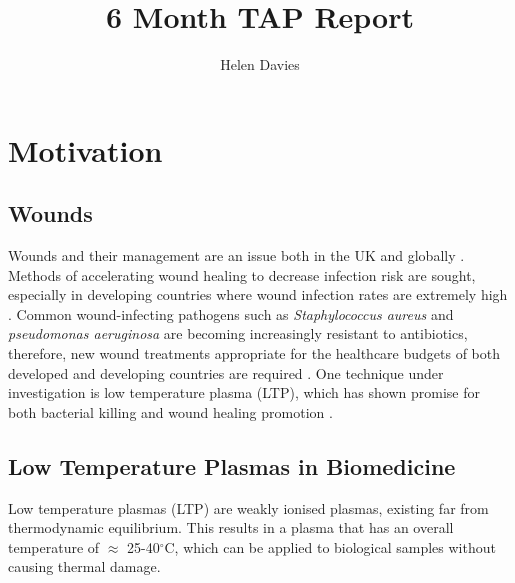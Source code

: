 \documentclass[11pt, oneside]{article}   	%
\title{6 Month TAP Report}
\author{Helen Davies}
\date{}							%
\begin{document}
\maketitle

\section{Motivation}
\subsection{Wounds}

Wounds and their management are an issue both in the UK and globally \cite{Posnett2008the}.
Methods of accelerating wound healing to decrease infection risk are sought, especially in developing countries where wound infection rates are extremely high \cite{Kihla2014risk}. 
Common wound-infecting pathogens such as \textit{Staphylococcus aureus} and \textit{pseudomonas aeruginosa} \cite{Church2006burn, Bowler2001wound} are becoming increasingly resistant to antibiotics, therefore, new wound treatments appropriate for the healthcare budgets of both developed and developing countries are required \cite{Chambers2009waves, Godebo2013multidrug, Howell2005a}.
One technique under investigation is low temperature plasma (LTP), which has shown promise for both bacterial killing and wound healing promotion \cite{Kong2009plasma, Kramer2013suitability, Isbary2012successful, Isbary2010a}.

\subsection{Low Temperature Plasmas in Biomedicine}
Low temperature plasmas (LTP) are weakly ionised plasmas, existing far from thermodynamic equilibrium.
This results in a plasma that has an overall temperature of $\approx$ 25-40$^\circ$C, which can be applied to biological samples without causing thermal damage.
\end{document}
